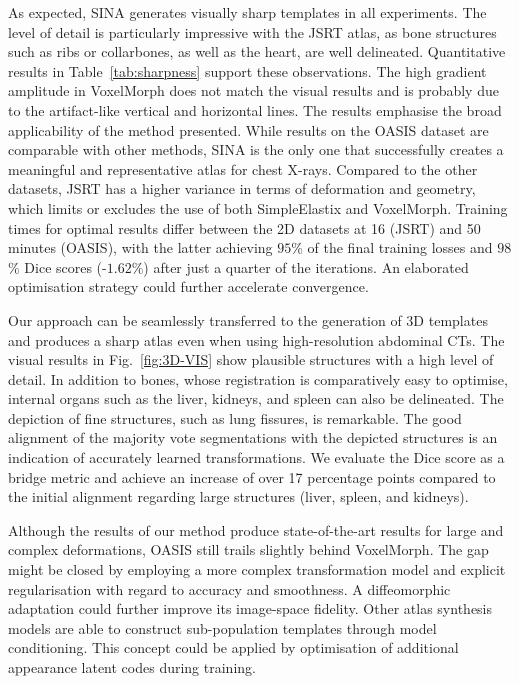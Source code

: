 As expected, SINA generates visually sharp templates in all experiments. The level of detail is particularly impressive with the JSRT atlas, as bone structures such as ribs or collarbones, as well as the heart, are well delineated. Quantitative results in Table~\ref{tab:sharpness} support these observations. The high gradient amplitude in VoxelMorph does not match the visual results and is probably due to the artifact-like vertical and horizontal lines. 
The results emphasise the broad applicability of the method presented. While results on the OASIS dataset are comparable with other methods, SINA is the only one that successfully creates a meaningful and representative atlas for chest X-rays. Compared to the other datasets, JSRT has a higher variance in terms of deformation and geometry, which limits or excludes the use of both SimpleElastix and VoxelMorph. 
Training times for optimal results differ between the 2D datasets at 16 (JSRT) and 50 minutes (OASIS), with the latter achieving $95$\% of the final training losses and $98$\% Dice scores (-$1.62\%$) after just a quarter of the iterations. An elaborated optimisation strategy could further accelerate convergence. 

Our approach can be seamlessly transferred to the generation of 3D templates and produces a sharp atlas even when using high-resolution abdominal CTs. The visual results in Fig.~\ref{fig:3D-VIS} show plausible structures with a high level of detail. In addition to bones, whose registration is comparatively easy to optimise, internal organs such as the liver, kidneys, and spleen can also be delineated. The depiction of fine structures, such as lung fissures, is remarkable. The good alignment of the majority vote segmentations with the depicted structures is an indication of accurately learned transformations. We evaluate the Dice score as a bridge metric and achieve an increase of over 17 percentage points compared to the initial alignment regarding large structures (liver, spleen, and kidneys). 

Although the results of our method produce state-of-the-art results for large and complex deformations, OASIS still trails slightly behind VoxelMorph. The gap might be closed by employing a more complex transformation model and explicit regularisation with regard to accuracy and smoothness. A diffeomorphic adaptation could further improve its image-space fidelity. Other atlas synthesis models are able to construct sub-population templates through model conditioning. This concept could be applied by optimisation of additional appearance latent codes during training.

